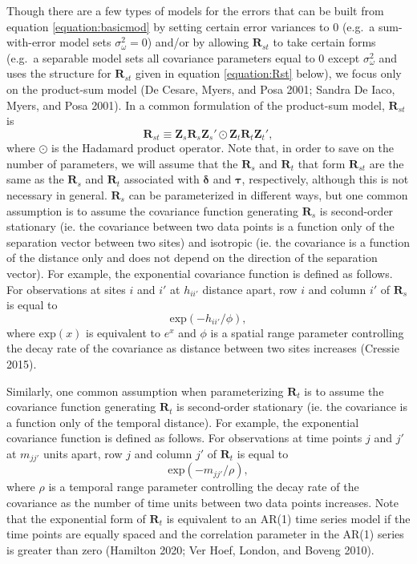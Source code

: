 \documentclass[smallextended]{svjour3}       %
\begin{document}
Though there are a few types of models for the errors that can be built
from equation \ref{equation:basicmod} by setting certain error variances
to 0 (e.g.~a sum-with-error model sets \(\sigma^2_{\omega} = 0\)) and/or
by allowing \(\mathbf{R}_{st}\) to take certain forms (e.g.~a separable
model sets all covariance parameters equal to \(0\) except
\(\sigma^2_{\omega}\) and uses the structure for \(\mathbf{R}_{st}\)
given in equation \ref{equation:Rst} below), we focus only on the
product-sum model (De Cesare, Myers, and Posa 2001; Sandra De Iaco,
Myers, and Posa 2001). In a common formulation of the product-sum model,
\(\mathbf{R}_{st}\) is \mbox{} \begin{equation}
\label{equation:Rst}
\mathbf{R}_{st} \equiv \mathbf{Z}_{s} \mathbf{R}_{s} \mathbf{Z}_{s}' \odot \mathbf{Z}_t \mathbf{R}_t \mathbf{Z}_t',
\end{equation} \noindent where \(\odot\) is the Hadamard product
operator. Note that, in order to save on the number of parameters, we
will assume that the \(\mathbf{R}_s\) and \(\mathbf{R}_t\) that form
\(\mathbf{R}_{st}\) are the same as the \(\mathbf{R}_s\) and
\(\mathbf{R}_t\) associated with \(\bm{\delta}\) and \(\bm{\tau}\),
respectively, although this is not necessary in general.
\(\mathbf{R}_s\) can be parameterized in different ways, but one common
assumption is to assume the covariance function generating
\(\mathbf{R}_s\) is second-order stationary (ie. the covariance between
two data points is a function only of the separation vector between two
sites) and isotropic (ie. the covariance is a function of the distance
only and does not depend on the direction of the separation vector). For
example, the exponential covariance function is defined as follows. For
observations at sites \(i\) and \(i'\) at \(h_{ii'}\) distance apart,
row \(i\) and column \(i'\) of \(\mathbf{R}_{s}\) is equal to \mbox{}
\begin{equation}
\label{equation:spatcov}
\text{exp}(-h_{ii'} / \phi),
\end{equation} \noindent where \(\text{exp}(x)\) is equivalent to
\(e^x\) and \(\phi\) is a spatial range parameter controlling the decay
rate of the covariance as distance between two sites increases (Cressie
2015).

Similarly, one common assumption when parameterizing \(\mathbf{R}_t\) is
to assume the covariance function generating \(\mathbf{R}_t\) is
second-order stationary (ie. the covariance is a function only of the
temporal distance). For example, the exponential covariance function is
defined as follows. For observations at time points \(j\) and \(j'\) at
\(m_{jj'}\) units apart, row \(j\) and column \(j'\) of
\(\mathbf{R}_{t}\) is equal to \mbox{} \begin{equation}
\label{equation:tempcov}
\text{exp}(-m_{jj'} / \rho),
\end{equation} \noindent where \(\rho\) is a temporal range parameter
controlling the decay rate of the covariance as the number of time units
between two data points increases. Note that the exponential form of
\(\mathbf{R}_t\) is equivalent to an AR(1) time series model if the time
points are equally spaced and the correlation parameter in the AR(1)
series is greater than zero (Hamilton 2020; Ver Hoef, London, and Boveng
2010).
\end{document}
